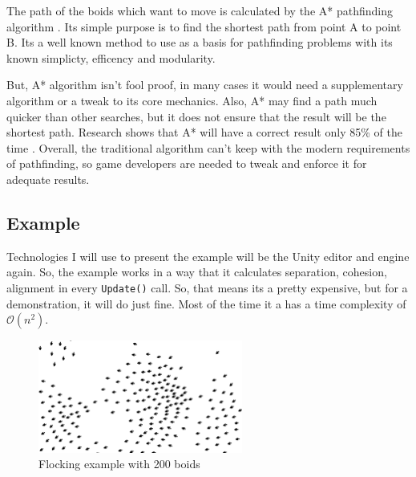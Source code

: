 \documentclass[a4paper, 12pt]{book}
\begin{document}
The path of the boids which want to move is calculated by the A* pathfinding algorithm \cite{FOEAD2021507}. Its simple purpose is to find the shortest path from point A to point B. Its a well known method to use as a basis for pathfinding problems with its known  simplicty, efficency and modularity.

But, A* algorithm isn't fool proof, in many cases it would need a supplementary algorithm or a tweak to its core mechanics. Also, A* may find a path much quicker than other searches, but it does not ensure that the result will be the shortest path. Research shows that A* will have a correct result only 85\% of the time \cite{FOEAD2021507}. Overall, the traditional algorithm can't keep with the modern requirements of pathfinding, so game developers are needed to tweak and enforce it for adequate results.

\clearpage

\subsection{Example}

Technologies I will use to present the example will be the Unity \cite{UnitySoftware} editor and engine again. So, the example works in a way that it calculates separation, cohesion, alignment in every \texttt{Update()} call. So, that means its a pretty expensive, but for a demonstration, it will do just fine. Most of the time it a has a time complexity of $ \mathcal{O}(n^2) $.

\begin{figure}[h]
\begin{center}
\includegraphics[width=0.6\textwidth]{Images/FlockingExample.png}
\end{center}
\caption{Flocking example with 200 boids}
\label{100boids}
\end{figure}
\end{document}
